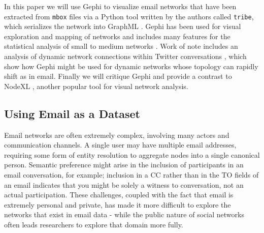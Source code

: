 \documentclass[11pt,letterpaper]{article}
\begin{document}
In this paper we will use Gephi \cite{gephi_gephi-open_2010} to visualize email networks that have been extracted from \texttt{mbox} files via a Python tool written by the authors called \texttt{tribe}, which serializes the network into GraphML \cite{brandes_graph_2010}. Gephi has been used for visual exploration and mapping of networks \cite{bastian_gephi:_2009} and includes many features for the statistical analysis of small to medium networks \cite{mcsweeney_gephi_2009}. Work of note includes an analysis of dynamic network connections within Twitter conversations \cite{bruns_how_2012}, which show how Gephi might be used for dynamic networks whose topology can rapidly shift as in email. Finally we will critique Gephi and provide a contrast to NodeXL \cite{smith_nodexl:_2010}, another popular tool for visual network analysis.

\subsection*{Using Email as a Dataset}

Email networks are often extremely complex, involving many actors and communication channels. A single user may have multiple email addresses, requiring some form of entity resolution to aggregate nodes into a single canonical person. Semantic preference might arise in the inclusion of participants in an email conversation, for example; inclusion in a CC rather than in the TO fields of an email indicates that you might be solely a witness to conversation, not an actual participation. These challenges, coupled with the fact that email is extremely personal and private, has made it more difficult to explore the networks that exist in email data - while the public nature of social networks often leads researchers to explore that domain more fully.
\end{document}
